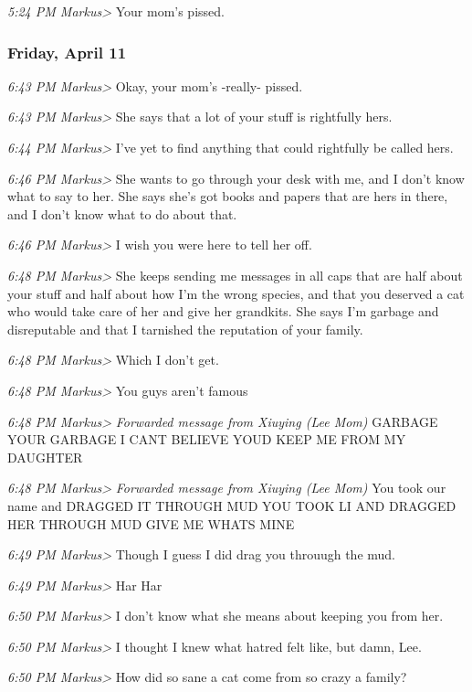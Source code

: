 {\emph{5:24 PM Markus\textgreater{}} Your mom's pissed.

\subsubsection*{Friday, April 11}\label{friday-april-11}

\emph{6:43 PM Markus\textgreater{}} Okay, your mom's -really- pissed.

\emph{6:43 PM Markus\textgreater{}} She says that a lot of your stuff is
rightfully hers.

\emph{6:44 PM Markus\textgreater{}} I've yet to find anything that could
rightfully be called hers.

\emph{6:46 PM Markus\textgreater{}} She wants to go through your desk
with me, and I don't know what to say to her. She says she's got books
and papers that are hers in there, and I don't know what to do about
that.

\emph{6:46 PM Markus\textgreater{}} I wish you were here to tell her
off.

\emph{6:48 PM Markus\textgreater{}} She keeps sending me messages in all
caps that are half about your stuff and half about how I'm the wrong
species, and that you deserved a cat who would take care of her and give
her grandkits. She says I'm garbage and disreputable and that I
tarnished the reputation of your family.

\emph{6:48 PM Markus\textgreater{}} Which I don't get.

\emph{6:48 PM Markus\textgreater{}} You guys aren't famous

\emph{6:48 PM Markus\textgreater{}} \emph{Forwarded message from Xiuying
(Lee Mom)} GARBAGE YOUR GARBAGE I CANT BELIEVE YOUD KEEP ME FROM MY
DAUGHTER

\emph{6:48 PM Markus\textgreater{}} \emph{Forwarded message from Xiuying
(Lee Mom)} You took our name and DRAGGED IT THROUGH MUD YOU TOOK LI AND
DRAGGED HER THROUGH MUD GIVE ME WHATS MINE

\emph{6:49 PM Markus\textgreater{}} Though I guess I did drag you
throuugh the mud.

\emph{6:49 PM Markus\textgreater{}} Har Har

\emph{6:50 PM Markus\textgreater{}} I don't know what she means about
keeping you from her.

\emph{6:50 PM Markus\textgreater{}} I thought I knew what hatred felt
like, but damn, Lee.

\emph{6:50 PM Markus\textgreater{}} How did so sane a cat come from so
crazy a family?

}
